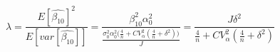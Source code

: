 \begin{equation}
\label{eq:lambda}
\lambda = \frac{E[\hat{\beta_{10}}]^2}{E[var[\hat{\beta_{10}}]]} = \frac{\beta_{10}^2\alpha_0^2}{\frac{\sigma_0^2\alpha_0^2\Big(\frac{4}{n} + CV_{\alpha}^2(\frac{4}{n} + \delta^2)\Big)}{J}} = \frac{J\delta^2}{\frac{4}{n}+CV_{\alpha}^2(\frac{4}{n} + \delta^2)}
\end{equation}